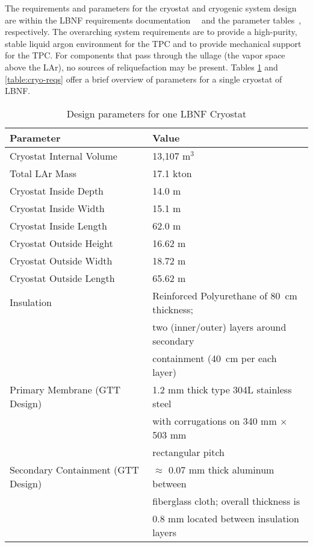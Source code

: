 The requirements and parameters for the cryostat and cryogenic system 
design are within the LBNF requirements documentation~\cite{lar-fd-req}~\cite{lar-fd-req-traceback}  
and the parameter tables~\cite{lar-fd-params}, respectively. The 
overarching system requirements are to provide a high-purity, 
stable liquid argon environment for the TPC and to provide 
mechanical support for the TPC. For components that pass 
through the ullage (the vapor space above the LAr), no 
sources of reliquefaction may be present. Tables 
\ref{table:param-summ-LBNF} and \ref{table:cryo-reqs} 
offer a brief overview of parameters for a single 
cryostat of LBNF.

\begin{table}
\caption{Design parameters for one LBNF Cryostat}
\label{table:param-summ-LBNF}
 \begin{tabular}[htbp]{|l| p{8cm} |}
\hline
\textbf{Parameter} &  \textbf{Value} \\
\hline\hline
Cryostat Internal Volume &  13,107 m$^3$ \\
\hline
Total LAr Mass & 17.1 kton \\
\hline
Cryostat Inside Depth & 14.0 m \\
\hline
Cryostat Inside Width & 15.1 m \\
\hline
Cryostat Inside Length & 62.0 m  \\
\hline
Cryostat Outside Height & 16.62 m \\
\hline
Cryostat Outside Width & 18.72 m \\
\hline
Cryostat Outside Length & 65.62 m \\
\hline
Insulation &  Reinforced Polyurethane of 80~cm thickness; \\
           &  two (inner/outer) layers around secondary \\
           &  containment (40~cm per each layer) \\ 
\hline
Primary Membrane (GTT Design) & 1.2 mm thick type 304L stainless steel \\
                              & with corrugations on 340 mm $\times$ 503 mm \\
                       & rectangular pitch\\
\hline
Secondary Containment (GTT Design) & $\approx$ 0.07 mm thick aluminum between \\ 
                            & fiberglass cloth; overall thickness is \\
                            & 0.8 mm located between insulation layers \\

\end{tabular}
\end{table}
